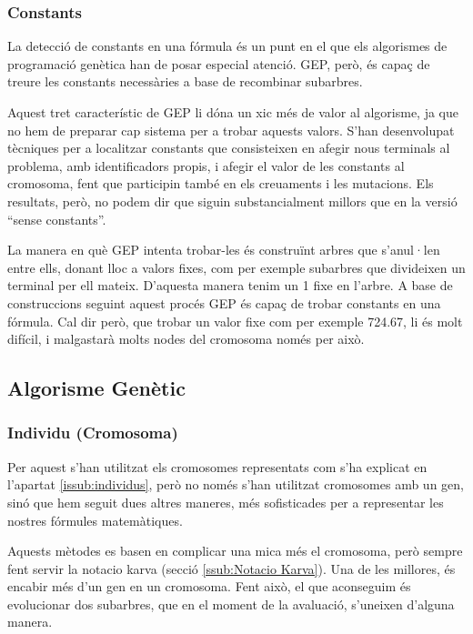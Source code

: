 

\subsubsection{Constants} %
\label{ssub:Constants}
La detecció de constants en una fórmula és un punt en el que els algorismes de
programació genètica han de posar especial atenció.  GEP, però, és capaç de
treure les constants necessàries a base de recombinar subarbres.

Aquest tret característic de GEP li dóna un xic més de valor al algorisme, ja
que no hem de preparar cap sistema per a trobar aquests valors.  S'han
desenvolupat tècniques per a localitzar constants que consisteixen en afegir
nous terminals al problema, amb identificadors propis, i afegir el valor de les
constants al cromosoma, fent que participin també en els creuaments i les
mutacions.  Els resultats, però, no podem dir que siguin substancialment millors
que en la versió ``sense constants''.

La manera en què GEP intenta trobar-les és construïnt arbres que s'anul·len
entre ells, donant lloc a valors fixes, com per exemple subarbres que divideixen
un terminal per ell mateix.  D'aquesta manera tenim un 1 fixe en l'arbre.  A
base de construccions seguint aquest procés GEP és capaç de trobar constants en
una fórmula.  Cal dir però, que trobar un valor fixe com per exemple 724.67, li
és molt difícil, i malgastarà molts nodes del cromosoma només per això.


\subsection{Algorisme Genètic} %
\label{ssec:GAlgorisme Genetic}

\subsubsection{Individu (Cromosoma)} %
\label{ssub:Individu (Cromosoma}

Per aquest s'han utilitzat els cromosomes representats com s'ha explicat en
l'apartat \ref{issub:individus}, però no només s'han utilitzat cromosomes amb un
gen, sinó que hem seguit dues altres maneres, més sofisticades per a representar
les nostres fórmules matemàtiques.

Aquests mètodes \cite{ferreira:2006} es basen en complicar una mica més el cromosoma,
però sempre fent servir la notacio karva (secció \ref{ssub:Notacio Karva}).  Una de les millores, és
encabir més d'un gen en un cromosoma. Fent això, el que aconseguim és
evolucionar dos subarbres, que en el moment de la avaluació, s'uneixen d'alguna
manera.

